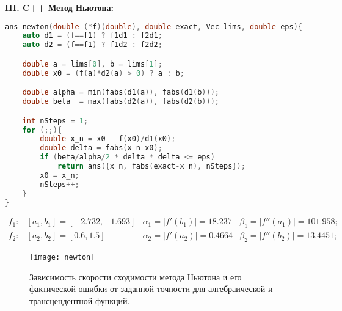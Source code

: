 \clearpage

{\large\bf{III. C++ Метод Ньютона:}}
\begin{lstlisting}[language=c++, firstnumber=21]
ans newton(double (*f)(double), double exact, Vec lims, double eps){
    auto d1 = (f==f1) ? f1d1 : f2d1;
    auto d2 = (f==f1) ? f1d2 : f2d2;

    double a = lims[0], b = lims[1];
    double x0 = (f(a)*d2(a) > 0) ? a : b;

    double alpha = min(fabs(d1(a)), fabs(d1(b)));
    double beta  = max(fabs(d2(a)), fabs(d2(b)));

    int nSteps = 1;
    for (;;){
        double x_n = x0 - f(x0)/d1(x0);
        double delta = fabs(x_n-x0);
        if (beta/alpha/2 * delta * delta <= eps)
            return ans({x_n, fabs(exact-x_n), nSteps});
        x0 = x_n;
        nSteps++;
    }
}
\end{lstlisting}
\[
\begin{matrix}
    f_1: & [a_1,b_1] =\mathit{[-2.732, -1.693]} &\alpha_1=|f'(b_1)|=\mathbf{18.237} &\beta_1=|f''(a_1)|=\mathbf{101.958}; \\
    f_2: & [a_2,b_2] =\mathit{[0.6, 1.5]} &\alpha_2=|f'(a_2)|=\mathbf{0.4664} &\beta_2=|f''(b_2)|=\mathbf{13.4451};
\end{matrix}
\]
\begin{figure}[H]
    \centering
    \caption{Зависимость скорости сходимости метода Ньютона и его фактической ошибки от заданной точности для алгебраической и трансцендентной функций.}
    \label{fig:pic5}
    \texttt{[image: newton]}
\end{figure}

\clearpage

